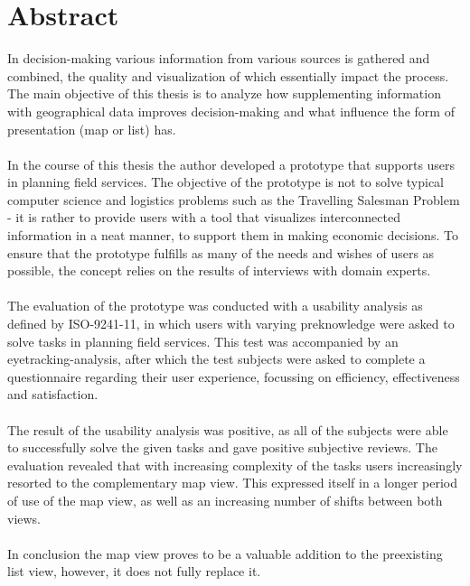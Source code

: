 \documentclass[Bachelorarbeit.tex]{subfiles}
\begin{document}
\chapter*{Abstract}
In decision-making various information from various sources is gathered and combined, the quality and visualization of which essentially impact the process.
The main objective of this thesis is to analyze how supplementing information with geographical data improves decision-making and what influence the form of presentation (map or list) has.
\\
\\
In the course of this thesis the author developed a prototype that supports users in planning field services. 
The objective of the prototype is not to solve typical computer science and logistics problems such as the Travelling Salesman Problem - it is rather to provide users with a tool that visualizes interconnected information in a neat manner, to support them in making economic decisions.
To ensure that the prototype fulfills as many of the needs and wishes of users as possible, the concept relies on the results of interviews with domain experts.
\\
\\
The evaluation of the prototype was conducted with a usability analysis as defined by ISO-9241-11, in which users with varying preknowledge were asked to solve tasks in planning field services.
This test was accompanied by an eyetracking-analysis, after which the test subjects were asked to complete a questionnaire regarding their user experience, focussing on efficiency, effectiveness and satisfaction.
\\
\\
The result of the usability analysis was positive, as all of the subjects were able to successfully solve the given tasks and gave positive subjective reviews.
The evaluation revealed that with increasing complexity of the tasks users increasingly resorted to the complementary map view.  
This expressed itself in a longer period of use of the map view, as well as an increasing number of shifts between both views.
\\
\\
In conclusion the map view proves to be a valuable addition to the preexisting list view, however, it does not fully replace it.
\end{document}
